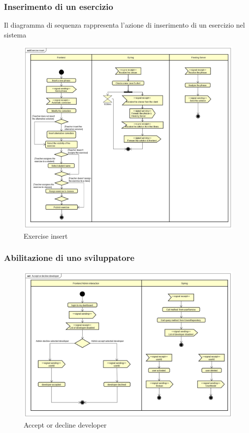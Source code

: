 \subsubsection{Inserimento di un esercizio}
Il diagramma di sequenza rappresenta l'azione di inserimento di un esercizio nel sistema
\begin{figure}[H]
\centering
\includegraphics[width=17cm, keepaspectratio]{img/Exercise-insert.png} 
\caption{Exercise insert}
\end{figure}

\subsubsection{Abilitazione di uno sviluppatore}
\begin{figure}[H]
\centering
\includegraphics[width=17cm, keepaspectratio]{img/Accept-or-decline-developer.png} 
\caption{Accept or decline developer}
\end{figure}

